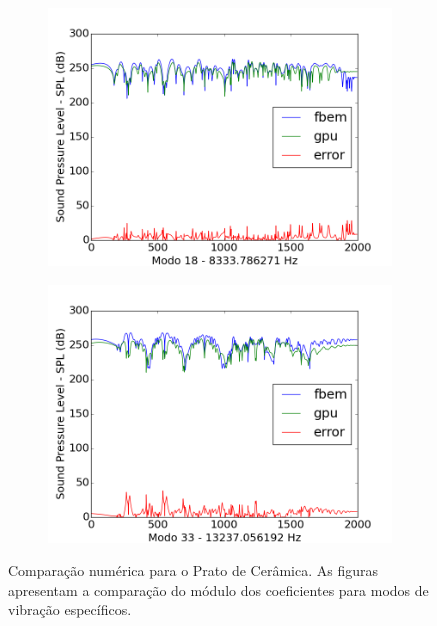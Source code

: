 \begin{figure}[ht]
\begin{subfigure}{0.45\textwidth}
	\label{fig:coef_plate_2}
	\caption{}
\end{subfigure}
\begin{subfigure}{0.45\textwidth}
	\centering
	\includegraphics[width=\textwidth]{../data/transfer_test/ceramic_plate/plots/ceramic_plate-tfv-0_18.png}
	\caption{}
	\label{fig:coef_plate_18}
\end{subfigure}%
\begin{subfigure}{0.45\textwidth}
	\centering
	\includegraphics[width=\textwidth]{../data/transfer_test/ceramic_plate/plots/ceramic_plate-tfv-0_33.png}
	\caption{}
	\label{fig:coef_plate_33}
\end{subfigure}
\caption[Comparação numérica para o Prato de Cerâmica]{Comparação numérica para o Prato de Cerâmica. As figuras apresentam a comparação do módulo dos coeficientes para modos de vibração específicos.}
\label{fig:coef_plate}
\end{figure}

